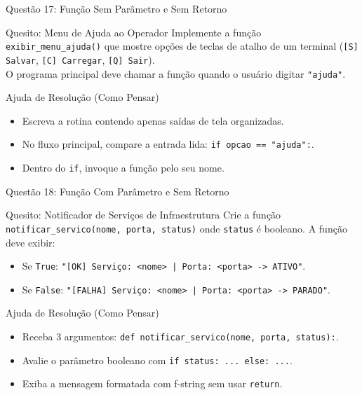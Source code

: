 \begin{frame}{Questão 17: Função Sem Parâmetro e Sem Retorno}
    \begin{block}{Quesito: Menu de Ajuda ao Operador}
        Implemente a função \texttt{exibir\_menu\_ajuda()} que mostre opções de teclas de atalho de um terminal (\texttt{[S] Salvar}, \texttt{[C] Carregar}, \texttt{[Q] Sair}). \\
        O programa principal deve chamar a função quando o usuário digitar \texttt{"ajuda"}.
    \end{block}

    \begin{exampleblock}{Ajuda de Resolução (Como Pensar)}
        \begin{itemize}
            \item Escreva a rotina contendo apenas saídas de tela organizadas.
            \item No fluxo principal, compare a entrada lida: \texttt{if opcao == "ajuda":}.
            \item Dentro do \texttt{if}, invoque a função pelo seu nome.
        \end{itemize}
    \end{exampleblock}
\end{frame}

\begin{frame}{Questão 18: Função Com Parâmetro e Sem Retorno}
    \begin{block}{Quesito: Notificador de Serviços de Infraestrutura}
        Crie a função \texttt{notificar\_servico(nome, porta, status)} onde \texttt{status} é booleano. A função deve exibir:
        \begin{itemize}
            \item Se \texttt{True}: \texttt{"[OK] Serviço: <nome> | Porta: <porta> -> ATIVO"}.
            \item Se \texttt{False}: \texttt{"[FALHA] Serviço: <nome> | Porta: <porta> -> PARADO"}.
        \end{itemize}
    \end{block}

    \begin{exampleblock}{Ajuda de Resolução (Como Pensar)}
        \begin{itemize}
            \item Receba 3 argumentos: \texttt{def notificar\_servico(nome, porta, status):}.
            \item Avalie o parâmetro booleano com \texttt{if status: ... else: ...}.
            \item Exiba a mensagem formatada com f-string sem usar \texttt{return}.
        \end{itemize}
    \end{exampleblock}
\end{frame}

